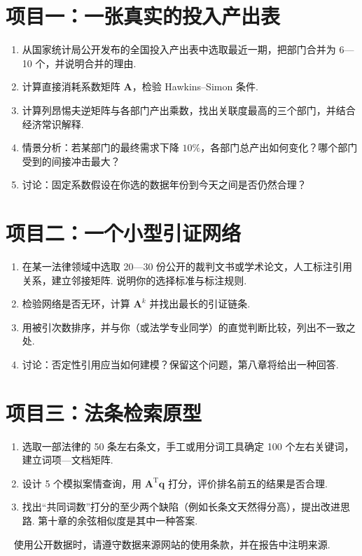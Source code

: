 \documentclass[lang=cn,10.5pt,scheme=chinese,toc=twocol,section,chinesefont=nofont,
twoside,citestyle=gb7714-2015,bibstyle=gb7714-2015]{elegantbook}
\newcommand*{\kaishu}{\CJKfamily{zhkai}}
\renewcommand*{\citshape}{\kaishu}
\newcommand{\vv}[1]{\boldsymbol{#1}}
\newcommand{\trans}{\mathrm{T}}             %
\numberwithin{equation}{section}   %
\newcommand*{\lnlabel}[1]{{\sffamily\bfseries\color{black}#1}}
\renewenvironment{note}{%
	\par\noindent\makebox[-3pt][r]{\scriptsize\color{black}\textdbend\quad}%
	\lnlabel{\notename}\ \citshape}{\par}
\begin{document}
\section*{项目一：一张真实的投入产出表}
\begin{enumerate}
  \item 从国家统计局公开发布的全国投入产出表中选取最近一期，把部门合并为 6—10 个，并说明合并的理由.
  \item 计算直接消耗系数矩阵 $\vv A$，检验 Hawkins–Simon 条件.
  \item 计算列昂惕夫逆矩阵与各部门产出乘数，找出关联度最高的三个部门，并结合经济常识解释.
  \item 情景分析：若某部门的最终需求下降 $10\%$，各部门总产出如何变化？哪个部门受到的间接冲击最大？
  \item 讨论：固定系数假设在你选的数据年份到今天之间是否仍然合理？
\end{enumerate}

\section*{项目二：一个小型引证网络}
\begin{enumerate}
  \item 在某一法律领域中选取 20—30 份公开的裁判文书或学术论文，人工标注引用关系，建立邻接矩阵. 说明你的选择标准与标注规则.
  \item 检验网络是否无环，计算 $\vv A^k$ 并找出最长的引证链条.
  \item 用被引次数排序，并与你（或法学专业同学）的直觉判断比较，列出不一致之处.
  \item 讨论：否定性引用应当如何建模？保留这个问题，第八章将给出一种回答.
\end{enumerate}

\section*{项目三：法条检索原型}
\begin{enumerate}
  \item 选取一部法律的 50 条左右条文，手工或用分词工具确定 100 个左右关键词，建立词项—文档矩阵.
  \item 设计 5 个模拟案情查询，用 $\vv A^\trans\vv q$ 打分，评价排名前五的结果是否合理.
  \item 找出“共同词数”打分的至少两个缺陷（例如长条文天然得分高），提出改进思路. 第十章的余弦相似度是其中一种答案.
\end{enumerate}

\begin{note}
  使用公开数据时，请遵守数据来源网站的使用条款，并在报告中注明来源.
\end{note}
\end{document}
